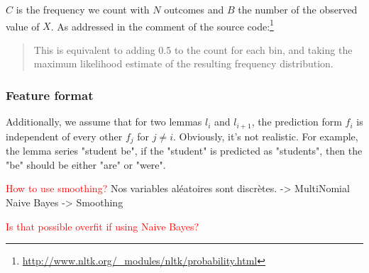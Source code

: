 \documentclass[a4paper]{article}
\begin{document}
$C$ is the frequency we count with $N$ outcomes and $B$ the number of the observed value of $X$. As addressed in the comment of the source code:\footnote{\url{http://www.nltk.org/_modules/nltk/probability.html}}
\begin{quotation}
This is equivalent to adding 0.5 to the count for each bin, and taking the maximum likelihood estimate of the resulting frequency distribution.
\end{quotation}


\subsubsection{Feature format}


Additionally, we assume that for two lemmas $l_i$ and $l_{i+1}$, the prediction form $f_{i}$ is independent of every other $f_{j}$ for $j \neq i$. Obviously, it's not realistic. For example, the lemma series "student be", if the "student" is predicted as "students", then the "be" should be either "are" or "were". 



\textcolor{red}{How to use smoothing?}
{ Nos variables aléatoires sont discrètes. -> MultiNomial Naive Bayes -> Smoothing}

\textcolor{red}{Is that possible overfit if using Naive Bayes?}
\end{document}
